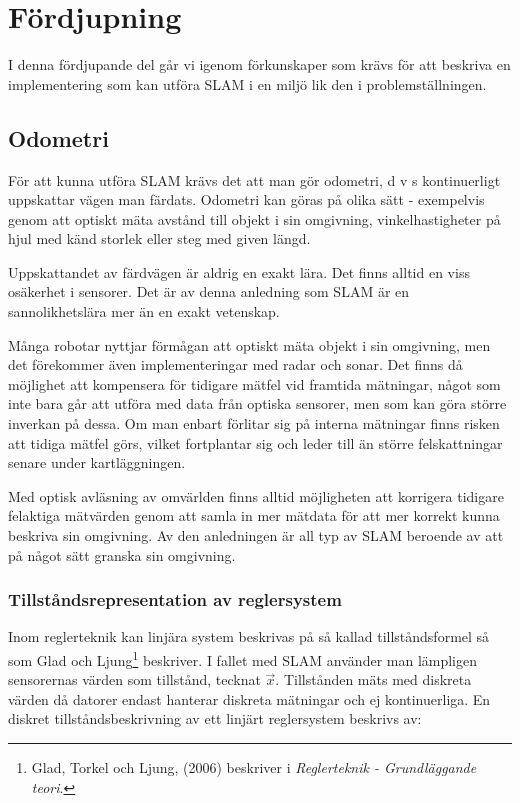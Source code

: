 \documentclass[a4paper,12pt,fleqn]{article}
\begin{document}
\newpage
\section{Fördjupning}
I denna fördjupande del går vi igenom förkunskaper som krävs för att beskriva en implementering som kan utföra SLAM i en miljö lik den i problemställningen. 

\subsection{Odometri}

För att kunna utföra SLAM krävs det att man gör odometri, d v s kontinuerligt uppskattar vägen man färdats. Odometri kan göras på olika sätt - exempelvis genom att optiskt mäta avstånd till objekt i sin omgivning, vinkelhastigheter på hjul med känd storlek eller steg med given längd. 

Uppskattandet av färdvägen är aldrig en exakt lära. Det finns alltid en viss osäkerhet i sensorer. Det är av denna anledning som SLAM är en sannolikhetslära mer än en exakt vetenskap. 

Många robotar nyttjar förmågan att optiskt mäta objekt i sin omgivning, men det förekommer även implementeringar med radar och sonar. Det finns då möjlighet att kompensera för tidigare mätfel vid framtida mätningar, något som inte bara går att utföra med data från optiska sensorer, men som kan göra större inverkan på dessa. Om man enbart förlitar sig på interna mätningar finns risken att tidiga mätfel görs, vilket fortplantar sig och leder till än större felskattningar senare under kartläggningen. 

Med optisk avläsning av omvärlden finns alltid möjligheten att korrigera tidigare felaktiga mätvärden genom att samla in mer mätdata för att mer korrekt kunna beskriva sin omgivning. Av den anledningen är all typ av SLAM beroende av att på något sätt granska sin omgivning. 

\subsubsection{Tillståndsrepresentation av reglersystem}

Inom reglerteknik kan linjära system beskrivas på så kallad tillståndsformel så som Glad och Ljung\footnote{Glad, Torkel och Ljung, (2006) beskriver i \textit{Reglerteknik - Grundläggande teori}.} beskriver. I fallet med SLAM använder man lämpligen sensorernas värden som tillstånd, tecknat $\vec{x}$. Tillstånden mäts med diskreta värden då datorer endast hanterar diskreta mätningar och ej kontinuerliga. En diskret tillståndsbeskrivning av ett linjärt reglersystem beskrivs av: 
\end{document}
